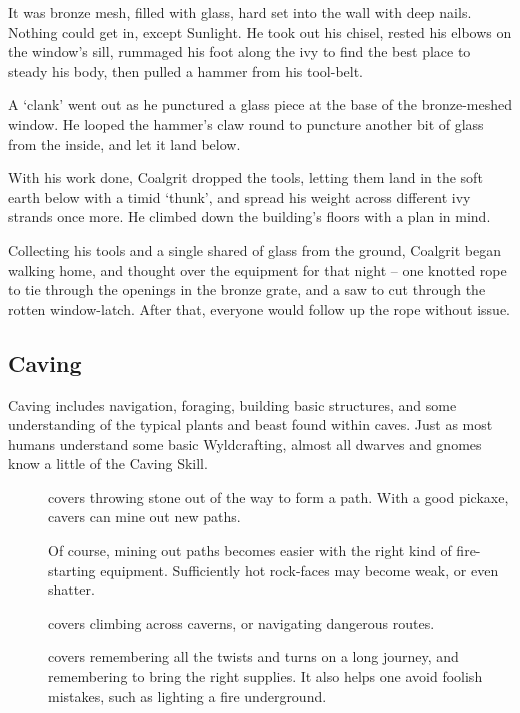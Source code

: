 \begin{multicols}{2}
\begin{exampletext}
  It was bronze mesh, filled with glass, hard set into the wall with deep nails.
  Nothing could get in, except Sunlight.
  He took out his chisel, rested his elbows on the window's sill, rummaged his foot along the ivy to find the best place to steady his body, then pulled a hammer from his tool-belt.

  A `clank' went out as he punctured a glass piece at the base of the bronze-meshed window.
  He looped the hammer's claw round to puncture another bit of glass from the inside, and let it land below.

  With his work done, Coalgrit dropped the tools, letting them land in the soft earth below with a timid `thunk', and spread his weight across different ivy strands once more.
  He climbed down the building's floors with a plan in mind.

  Collecting his tools and a single shared of glass from the ground, Coalgrit began walking home, and thought over the equipment for that night -- one knotted rope to tie through the openings in the bronze grate, and a saw to cut through the rotten window-latch.
  After that, everyone would follow up the rope without issue.
\end{exampletext}

\subsection{Caving}

Caving includes navigation, foraging, building basic structures, and some understanding of the typical plants and beast found within caves.
Just as most humans understand some basic Wyldcrafting, almost all dwarves and gnomes know a little of the Caving Skill.

\begin{description}
  \item[]
    covers throwing stone out of the way to form a path.
    With a good pickaxe, cavers can mine out new paths.

    Of course, mining out paths becomes easier with the right kind of fire-starting equipment.
    Sufficiently hot rock-faces may become weak, or even shatter.
  \item[]
    covers climbing across caverns, or navigating dangerous routes.
  \item[]
    covers remembering all the twists and turns on a long journey, and remembering to bring the right supplies.
    It also helps one avoid foolish mistakes, such as lighting a fire underground.


\end{description}
\end{multicols}
